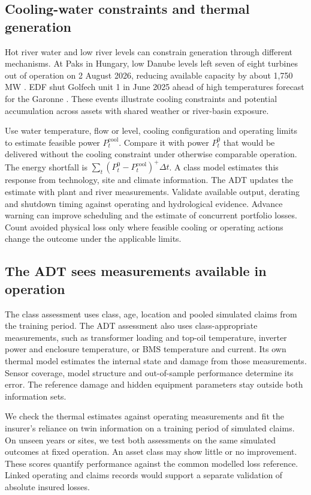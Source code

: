 \documentclass[11pt,a4paper]{article}
\begin{document}
\subsection*{Cooling-water constraints and thermal generation}

Hot river water and low river levels can constrain generation through different mechanisms. At Paks in Hungary, low Danube levels left seven of eight turbines out of operation on 2 August 2026, reducing available capacity by about 1,750\,MW \cite{paks}. EDF shut Golfech unit 1 in June 2025 ahead of high temperatures forecast for the Garonne \cite{golfech}. These events illustrate cooling constraints and potential accumulation across assets with shared weather or river-basin exposure.

Use water temperature, flow or level, cooling configuration and operating limits to estimate feasible power \(P^{\mathrm{cool}}_t\). Compare it with power \(P^{0}_t\) that would be delivered without the cooling constraint under otherwise comparable operation. The energy shortfall is \(\sum_t(P^0_t-P^{\mathrm{cool}}_t)^+\Delta t\). A class model estimates this response from technology, site and climate information. The ADT updates the estimate with plant and river measurements. Validate available output, derating and shutdown timing against operating and hydrological evidence. Advance warning can improve scheduling and the estimate of concurrent portfolio losses. Count avoided physical loss only where feasible cooling or operating actions change the outcome under the applicable limits.

\subsection*{The ADT sees measurements available in operation}

The class assessment uses class, age, location and pooled simulated claims from the training period. The ADT assessment also uses class-appropriate measurements, such as transformer loading and top-oil temperature, inverter power and enclosure temperature, or BMS temperature and current. Its own thermal model estimates the internal state and damage from those measurements. Sensor coverage, model structure and out-of-sample performance determine its error. The reference damage and hidden equipment parameters stay outside both information sets.

We check the thermal estimates against operating measurements and fit the insurer's reliance on twin information on a training period of simulated claims. On unseen years or sites, we test both assessments on the same simulated outcomes at fixed operation. An asset class may show little or no improvement. These scores quantify performance against the common modelled loss reference. Linked operating and claims records would support a separate validation of absolute insured losses.
\end{document}
